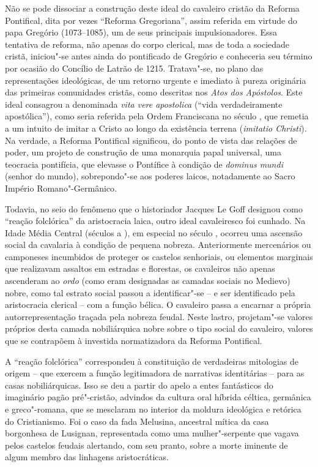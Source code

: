 Não se pode dissociar a construção deste ideal do cavaleiro cristão da Reforma Pontifical, dita por vezes “Reforma
Gregoriana”, assim referida em virtude do papa Gregório  (1073--1085), um de
seus principais impulsionadores. Essa tentativa de reforma, não apenas do corpo
clerical, mas de toda a sociedade cristã, iniciou"-se antes ainda do pontificado
de Gregório  e conheceria seu término por ocasião do  Concílio de Latrão
de 1215. Tratava"-se, no plano das representações ideológicas, de um retorno
urgente e imediato à pureza originária das primeiras comunidades cristãs, como
descritas nos \textit{Atos dos Apóstolos}. Este ideal consagrou a denominada
\textit{vita vere apostolica} (“vida verdadeiramente apostólica”), como seria
referida pela Ordem Franciscana no século , que remetia a um intuito de
imitar a Cristo ao longo da existência terrena (\textit{imitatio Christi}). Na
verdade, a Reforma Pontifical significou, do ponto de vista das relações de
poder, um projeto de construção de uma monarquia papal universal, uma teocracia
pontifícia, que elevasse o Pontífice à condição de \textit{dominus mundi}
(senhor do mundo), sobrepondo"-se aos poderes laicos, notadamente ao Sacro
Império Romano"-Germânico. 

Todavia, no seio do fenômeno que o historiador Jacques Le Goff designou como
“reação folclórica” da aristocracia laica, outro ideal cavaleiresco foi
cunhado. Na Idade Média Central (séculos  a ), em especial no século
, ocorreu uma ascensão social da cavalaria à condição de pequena nobreza.
Anteriormente mercenários ou camponeses incumbidos de proteger os castelos
senhoriais, ou elementos marginais que realizavam assaltos em estradas e
florestas, os cavaleiros não apenas ascenderam ao \textit{ordo} (como eram
designadas as camadas sociais no Medievo) nobre, como tal estrato social passou
a identificar"-se -- e ser identificado pela aristocracia clerical -- com a função
bélica. O cavaleiro passa a encarnar a própria autorrepresentação traçada pela
nobreza feudal. Neste lastro, projetam"-se valores próprios desta camada
nobiliárquica nobre sobre o tipo social do cavaleiro, valores que se contrapõem
à investida normatizadora da Reforma Pontifical. 

A “reação folclórica” correspondeu à constituição de verdadeiras mitologias de
origem -- que exercem a função legitimadora de narrativas identitárias -- para
as casas nobiliárquicas. Isso se deu a partir do apelo a entes fantásticos do
imaginário pagão pré"-cristão, advindos da cultura oral híbrida céltica,
germânica e greco"-romana, que se mesclaram no interior da moldura ideológica e
retórica do Cristianismo.  Foi o caso da fada Melusina, ancestral mítica da casa
borgonhesa de Lusignan, representada como uma mulher"-serpente que vagava pelos
castelos feudais alertando, com seu pranto, sobre a morte iminente de algum
membro das linhagens aristocráticas. 

